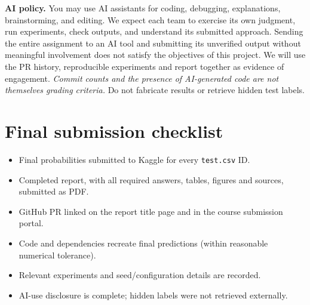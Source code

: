 \documentclass[11pt,letterpaper]{article}
\begin{document}
\textbf{AI policy.} You may use AI assistants for coding, debugging, explanations, brainstorming, and editing. We expect each team to exercise its own judgment, run experiments, check outputs, and understand its submitted approach. Sending the entire assignment to an AI tool and submitting its unverified output without meaningful involvement does not satisfy the objectives of this project. We will use the PR history, reproducible experiments and report together as evidence of engagement. \emph{Commit counts and the presence of AI-generated code are not themselves grading criteria.} Do not fabricate results or retrieve hidden test labels.


\section*{Final submission checklist}
\begin{itemize}[label=$\square$]
\item Final probabilities submitted to Kaggle for every \texttt{test.csv} ID.
\item Completed report, with all required answers, tables, figures and sources, submitted as PDF.
\item GitHub PR linked on the report title page and in the course submission portal.
\item Code and dependencies recreate final predictions (within reasonable numerical tolerance).
\item Relevant experiments and seed/configuration details are recorded.
\item AI-use disclosure is complete; hidden labels were not retrieved externally.
\end{itemize}
\end{document}
